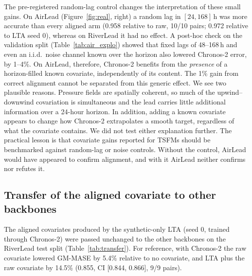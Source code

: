 \documentclass[preprint,11pt,authoryear]{elsarticle}
\newcommand{\lta}{\textsc{LTA}}
\begin{document}
The pre-registered random-lag control changes the interpretation of these small gains. On AirLead (Figure~\ref{fig:real}, right) a random lag in $[24,168]$\,h was more accurate than every aligned arm (0.958 relative to raw, 10/10 pairs; 0.972 relative to \lta{} seed 0), whereas on RiverLead it had no effect. A post-hoc check on the validation split (Table~\ref{tab:air_explo}) showed that fixed lags of 48--168\,h and even an i.i.d.\ noise channel known over the horizon also lowered Chronos-2 error, by 1--4\%. On AirLead, therefore, Chronos-2 benefits from the \emph{presence} of a horizon-filled known covariate, independently of its content. The 1\% gain from correct alignment cannot be separated from this generic effect. We see two plausible reasons. Pressure fields are spatially coherent, so much of the upwind--downwind covariation is simultaneous and the lead carries little additional information over a 24-hour horizon. In addition, adding a known covariate appears to change how Chronos-2 extrapolates a smooth target, regardless of what the covariate contains. We did not test either explanation further. The practical lesson is that covariate gains reported for TSFMs should be benchmarked against random-lag or noise controls. Without the control, AirLead would have appeared to confirm alignment, and with it AirLead neither confirms nor refutes it.



\subsection{Transfer of the aligned covariate to other backbones}
\label{sec:transfer}

The aligned covariates produced by the synthetic-only \lta{} (seed 0, trained through Chronos-2) were passed unchanged to the other backbones on the RiverLead test split (Table~\ref{tab:transfer}). For reference, with Chronos-2 the raw covariate lowered GM-MASE by 5.4\% relative to no covariate, and \lta{} plus the raw covariate by 14.5\% (0.855, CI [0.844, 0.866], 9/9 pairs).
\end{document}
